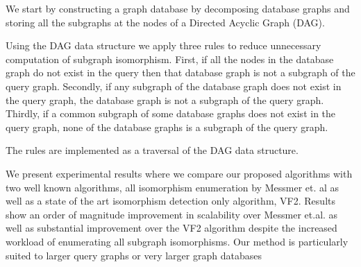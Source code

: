 We start by constructing a graph database by decomposing database graphs and storing all the subgraphs at the nodes of a Directed Acyclic Graph (DAG).

Using the DAG data structure we apply three rules to reduce unnecessary computation of subgraph isomorphism. First, if all the nodes in the database graph do not exist in the query then that database graph is not a subgraph of the query graph. Secondly, if any subgraph of the database graph does not exist in the query graph, the database graph is not a subgraph of the query graph. Thirdly, if a common subgraph of some database graphs does not exist in the query graph, none of the database graphs is a subgraph of the query graph.

The rules are implemented as a traversal of the DAG data structure. 

We present experimental results where we compare our proposed algorithms with two well known algorithms, all isomorphism enumeration by Messmer et. al as well as a state of the art isomorphism detection only algorithm, VF2. Results show an order of magnitude improvement in scalability over Messmer et.al. as well as substantial improvement over the VF2 algorithm despite the increased workload of enumerating all subgraph isomorphisms. Our method is particularly suited to larger query graphs or very larger graph databases


